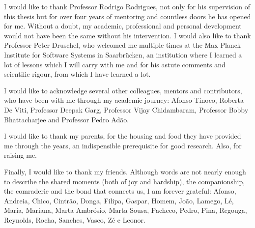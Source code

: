 
\noindent I would like to thank Professor Rodrigo
Rodrigues, not only for his supervision of this thesis but for
over four years of mentoring and countless doors he has opened for me.
Without a doubt, my academic, professional and
personal development would not have been the same without his
intervention. I would also like to thank Professor Peter
Druschel, who welcomed me multiple times at the Max Planck
Institute for Software Systems in Saarbrücken, an institution
where I learned a lot of lessons which I will carry with me and
for his astute comments and scientific rigour, from which I have
learned a lot.

I would like to acknowledge several other colleagues, mentors and
contributors, who have been with me through my
academic journey: Afonso Tinoco, Roberta De Viti, Professor
Deepak Garg, Professor Vijay Chidambaram, Professor Bobby
Bhattacharjee and Professor Pedro Adão.

I would like to thank my parents, for the housing and food they
have provided me through the years, an indispensible prerequisite for good
research. Also, for raising me.

Finally, I would like to thank my friends. Although words are not
nearly enough to describe the shared moments (both of joy and
hardship), the companionship, the comraderie and the bond that
connects us, I am forever grateful: Afonso, Andreia, Chico,
Cintrão, Donga, Filipa, Gaspar, Homem, João, Lamego, Lé, Maria, Mariana, Marta Ambrósio,
Marta Sousa, Pacheco, Pedro, Pina, Regouga, Reynolds, Rocha,
Sanches, Vasco, Zé e Leonor.
